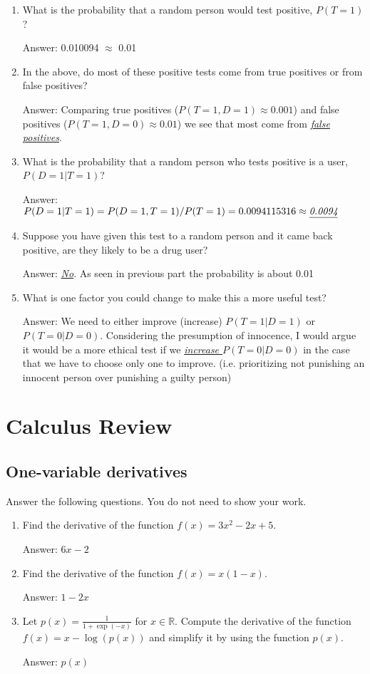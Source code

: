 \documentclass{article}
\def\ans#1{\par\gre{Answer: #1}}
\def\blu#1{{\color{blu}#1}}
\def\gre#1{{\color{gre}#1}}
\def\R{\mathbb{R}}
\begin{document}
\begin{enumerate}
\item What is the probability that a random person would test positive, $P(T=1)$?
\ans{0.010094 $\approx$ 0.01}
\item In the above, do most of these positive tests come from true positives or from false positives?
\ans{Comparing true positives ($P(T=1,D=1)\approx0.001$) and false positives ($P(T=1, D=0)\approx0.01$) we see that most come from \emph{\underline{false positives}}.}
\item What is the probability that a random person who tests positive is a user, $P(D=1|T=1)$?
\ans{$P(D=1|T=1) = P(D=1,T=1)/P(T=1) = 0.0094115316 \approx \emph{\underline{0.0094}}$}
\item Suppose you have given this test to a random person and it came back positive, are they likely to be a drug user?
\ans{\emph{\underline{No}}. As seen in previous part the probability is about 0.01}
\item What is one factor you could change to make this a more useful test?
\ans{We need to either improve (increase) $P(T=1|D=1)$ or $P(T=0|D=0)$. Considering the presumption of innocence, I would argue it would be a more ethical test if we \emph{\underline{increase $P(T=0|D=0)$}} in the case that we have to choose only one to improve. (i.e. prioritizing not punishing an innocent person over punishing a guilty person)}
\end{enumerate}


\section{Calculus Review}


\subsection{One-variable derivatives}

\blu{Answer the following questions.} You do not need to show your work.

\begin{enumerate}
\item Find the derivative of the function $f(x) = 3x^2 -2x + 5$.
\ans{$6x - 2$}
\item Find the derivative of the function $f(x) = x(1-x)$.
\ans{$1 - 2x$}
\item Let $p(x) = \frac{1}{1+\exp(-x)}$ for $x \in \R$. Compute the derivative of the function $f(x) = x-\log(p(x))$ and simplify it by using the function $p(x)$.
\ans{$p(x)$}
\end{enumerate}
\end{document}
